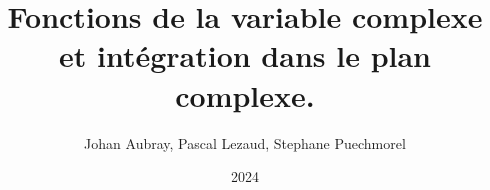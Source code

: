 \documentclass[a4paper, twoside, 12pt, notitlepage]{book}
\newtheorem{cor}{Corollaire}[section]
\theoremstyle{definition}
\theoremstyle{remarque}
\begin{document}
\newenvironment{fcor}{%
	\begin{lrbox}{\fthmbox}%
	\begin{minipage}{0.95\textwidth}
	\begin{cor}
	
}{%
\end{cor}
\end{minipage}
\end{lrbox}

\begin{center}
\begin{tikzpicture}
\node[thmbox] (box) {%
	\usebox{\fthmbox}
};
\end{tikzpicture}
\end{center}
}



\newenvironment{exercice}{
\begin{leftbar}
\stepcounter{ExoCtr}{\bfseries Exercice}
\arabic{ExoCtr}
}{\end{leftbar}}


\title{Fonctions de la variable complexe et intégration dans le plan complexe.}
\author{Johan Aubray, Pascal Lezaud, Stephane Puechmorel}
\date{2024} 

\maketitle


\tableofcontents









\appendix 





\end{document}
